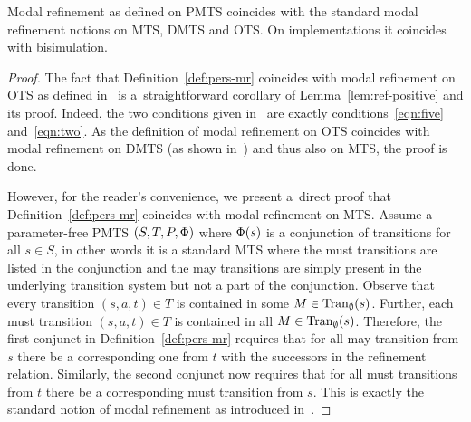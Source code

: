 \begin{theorem}\label{thm:ref-coincide}
Modal refinement as defined on PMTS coincides with the standard
modal refinement notions on MTS, DMTS and OTS.
On implementations it coincides with %
bisimulation.
\end{theorem}
\begin{proof}%
The fact that Definition~\ref{def:pers-mr} coincides with modal refinement
on OTS as defined in~\cite{benes_et_al:OASIcs:2011:3070} is a~straightforward
corollary of Lemma~\ref{lem:ref-positive} and its proof. 
Indeed, the two conditions given
in~\cite{benes_et_al:OASIcs:2011:3070} are exactly conditions~\eqref{eqn:five}
and~\eqref{eqn:two}. As the definition of modal refinement on OTS
coincides with modal refinement on DMTS (as shown in~\cite{benes_et_al:OASIcs:2011:3070}) and thus also on MTS, the proof 
is done.

However, for the reader's convenience, we present a~direct proof
that Definition~\ref{def:pers-mr} coincides with modal refinement
on MTS.
Assume a parameter-free PMTS $(S,T,P,\mathrm{\Phi})$ where
$\mathrm{\Phi}(s)$ is a conjunction of transitions for all $s \in S$, in
other words it is a standard MTS where the must transitions
are listed in the conjunction and the may transitions are simply
present in the underlying transition system but not a part of
the conjunction.
Observe that %
every transition $(s,a,t) \in T$ is contained in some 
$M \in \mathrm{Tran}_\emptyset(s)$. 
Further, each must transition $(s,a,t) \in T$  is contained in all 
$M \in \mathrm{Tran}_\emptyset(s)$. Therefore, the first conjunct in 
Definition~\ref{def:pers-mr} requires that for all may transition from $s$ 
there be a corresponding one from $t$ with the successors in the refinement 
relation. Similarly, the second conjunct now requires that for all must 
transitions from $t$ there be a corresponding must transition from $s$.
This is exactly the standard notion of modal refinement as introduced
in~\cite{DBLP:conf/lics/LarsenT88}.  
\end{proof}
 
